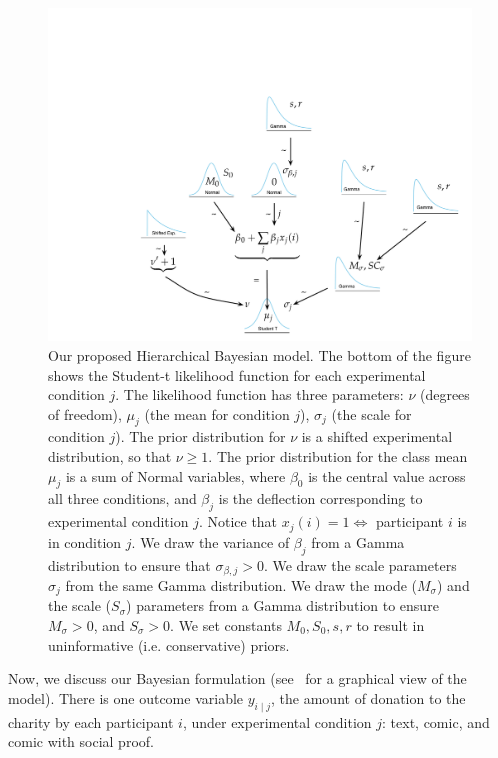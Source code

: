 \begin{figure}[htb]
    \centering
	\includegraphics[trim = 4in 0in 0in 4in, clip=true, width=1\textwidth]{./figures/gen_model.pdf}
    \caption{Our proposed Hierarchical Bayesian model. The bottom of the figure shows the Student-t likelihood function for each experimental condition $j$. The likelihood function has three parameters: $\nu$ (degrees of freedom), $\mu_j$ (the mean for condition $j$), $\sigma_j$ (the scale for condition $j$). The prior distribution for $\nu$ is a shifted experimental distribution, so that $\nu\geq 1$. The prior distribution for the class mean $\mu_j$ is a sum of Normal variables, where $\beta_0$ is the central value across all three conditions, and $\beta_j$ is the deflection corresponding to experimental condition $j$. Notice that $x_j(i) = 1 \iff$ participant $i$ is in condition $j$. We draw the variance of $\beta_j$ from a  Gamma distribution to ensure that $\sigma_{\beta, j} > 0$. We draw the scale parameters $\sigma_j$ from the same Gamma distribution. We draw the mode ($M_\sigma$) and the scale ($S_\sigma$) parameters from a Gamma distribution to ensure $M_\sigma>0$, and $S_\sigma > 0$. We set constants $M_0, S_0, s, r$ to result in uninformative (i.e. conservative) priors.
    }
	\label{fig:generative model}
\end{figure}



Now, we discuss our Bayesian formulation (see~ for a graphical view of the model). There is one outcome variable $y_{i \mid j}$, the amount of donation to the charity by each participant $i$, under experimental condition $j$: text, comic, and comic with social proof. 

